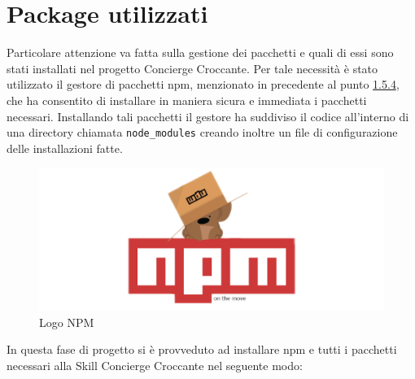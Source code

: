 \section{Package utilizzati}
Particolare attenzione va fatta sulla gestione dei pacchetti e quali di essi sono stati installati nel progetto Concierge Croccante. Per tale necessità è stato utilizzato il gestore di pacchetti npm, menzionato in precedente al punto \hyperref[npm]{1.5.4}, che ha consentito di installare in maniera sicura e immediata i pacchetti necessari. Installando tali pacchetti il gestore ha suddiviso il codice all'interno di una directory chiamata \texttt{node\_modules} creando inoltre un file di configurazione delle installazioni fatte.
\begin{figure}[H]
	\includegraphics[width=12cm]{immagini/logo-npm.png}
	\caption{\label{fig:logo_npm}Logo NPM}
\end{figure}
\noindent In questa fase di progetto si è provveduto ad installare npm e tutti i pacchetti necessari alla Skill Concierge Croccante nel seguente modo:
